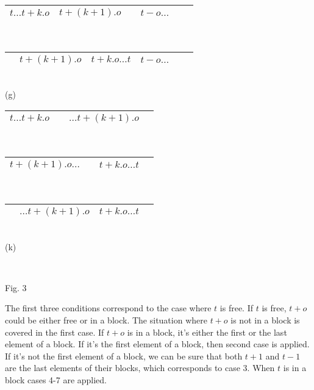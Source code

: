 \begin{minipage}[t]{0.5\textwidth}
\begin{center}
\begin{tabular}{ |c|c|c|c|c|c| }
 \hline 
 $t \ldots t+k.o$ & $t+(k+1).o$ & \hspace*{0.1cm} & $t - o \ldots$ & \hspace*{0.1cm} & \hspace{0.1cm} \\ 
 \hline
\end{tabular}\\
\begin{tabular}{ |c|c|c|c|c|c| }
 \hline 
 \hspace*{0.1cm} & $t+(k+1).o$ & $t+k.o \ldots t$ & $t - o \ldots$ & \hspace*{0.1cm} & \hspace{0.1cm} \\ 
 \hline
\end{tabular}
\\
(g)
\\[0.1in]
\begin{tabular}{ |c|c|c|c| }
 \hline 
 $t\ldots t+k.o$ & \hspace*{0.1cm} & $\ldots t+(k+1).o$ & \hspace{0.1cm} \\ 
 \hline
\end{tabular}\\
\begin{tabular}{ |c|c|c|c| }
 \hline 
 $t+(k+1).o \ldots$ & \hspace*{0.1cm} & $t+k.o \ldots t$ & \hspace{0.1cm} \\ 
 \hline
\end{tabular}\\
\begin{tabular}{ |c|c|c|c| }
 \hline 
 \hspace*{0.1cm} & $\ldots t+(k+1).o$ & $t+k.o \ldots t$ & \hspace{0.1cm} \\ 
 \hline
\end{tabular}\\
(k) 
\\[0.1in] 
\end{center} 
\end{minipage}%
\\
\begin{center}
Fig. 3 
\end{center}

The first three conditions correspond to the case where $t$ is free. If $t$ is free, $t+o$ could be either free or in a block. The situation where $t+o$ is not in a block is covered in the first case. If $t+o$ is in a block, it's either the first or the last element of a block. If it's the first element of a block, then second case is applied. If it's not the first element of a block, we can be sure that both $t+1$ and $t-1$ are the last elements of their blocks, which corresponds to case 3. When $t$ is in a block cases 4-7 are applied.\\

